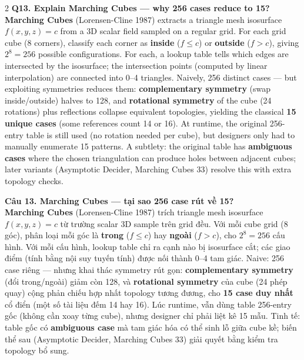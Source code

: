 \begin{paracol}{2}
\textbf{Q13. Explain Marching Cubes — why 256 cases reduce to 15?}\\
\textbf{Marching Cubes} (Lorensen-Cline 1987) extracts a triangle mesh isosurface $f(x,y,z) = c$ from a 3D scalar field sampled on a regular grid. For each grid cube (8 corners), classify each corner as \textbf{inside} ($f \le c$) or \textbf{outside} ($f > c$), giving $2^8 = 256$ possible configurations. For each, a lookup table tells which edges are intersected by the isosurface; the intersection points (computed by linear interpolation) are connected into 0--4 triangles. Naively, 256 distinct cases — but exploiting symmetries reduces them: \textbf{complementary symmetry} (swap inside/outside) halves to 128, and \textbf{rotational symmetry} of the cube (24 rotations) plus reflections collapse equivalent topologies, yielding the classical \textbf{15 unique cases} (some references count 14 or 16). At runtime, the original 256-entry table is still used (no rotation needed per cube), but designers only had to manually enumerate 15 patterns. A subtlety: the original table has \textbf{ambiguous cases} where the chosen triangulation can produce holes between adjacent cubes; later variants (Asymptotic Decider, Marching Cubes 33) resolve this with extra topology checks.

\switchcolumn

\textbf{Câu 13. Marching Cubes — tại sao 256 case rút về 15?}\\
\textbf{Marching Cubes} (Lorensen-Cline 1987) trích triangle mesh isosurface $f(x,y,z) = c$ từ trường scalar 3D sample trên grid đều. Với mỗi cube grid (8 góc), phân loại mỗi góc là \textbf{trong} ($f \le c$) hay \textbf{ngoài} ($f > c$), cho $2^8 = 256$ cấu hình. Với mỗi cấu hình, lookup table chỉ ra cạnh nào bị isosurface cắt; các giao điểm (tính bằng nội suy tuyến tính) được nối thành 0--4 tam giác. Naive: 256 case riêng — nhưng khai thác symmetry rút gọn: \textbf{complementary symmetry} (đổi trong/ngoài) giảm còn 128, và \textbf{rotational symmetry} của cube (24 phép quay) cộng phản chiếu hợp nhất topology tương đương, cho \textbf{15 case duy nhất} cổ điển (một số tài liệu đếm 14 hay 16). Lúc runtime, vẫn dùng table 256-entry gốc (không cần xoay từng cube), nhưng designer chỉ phải liệt kê 15 mẫu. Tinh tế: table gốc có \textbf{ambiguous case} mà tam giác hóa có thể sinh lỗ giữa cube kề; biến thể sau (Asymptotic Decider, Marching Cubes 33) giải quyết bằng kiểm tra topology bổ sung.

\switchcolumn*


\end{paracol}
